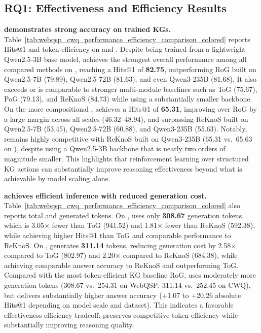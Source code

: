 \subsection{RQ1: Effectiveness and Efficiency Results}
\label{sec:exp1}



\noindent \textbf{\framework{} demonstrates strong accuracy on trained KGs.}
Table~\ref{tab:webqsp_cwq_performance_efficiency_comparison_colored} reports Hits@1 and token efficiency on  and . Despite being trained from a lightweight Qwen2.5-3B base model, \framework{} achieves the strongest overall performance among all compared methods on , reaching a Hits@1 of \textbf{82.75}, outperforming RoG built on Qwen2.5-7B (79.89), Qwen2.5-72B (81.63), and even Qwen3-235B (81.68). It also exceeds or is comparable to stronger multi-module baselines such as ToG (75.67), PoG (79.13), and ReKnoS (84.73) while using a substantially smaller backbone.
On the more compositional , \framework{} achieves a Hits@1 of \textbf{65.31}, improving over RoG by a large margin across all scales (46.32--48.94), and surpassing ReKnoS built on Qwen2.5-7B (53.45), Qwen2.5-72B (60.88), and Qwen3-235B (55.63). Notably, \framework{} remains highly competitive with ReKnoS built on Qwen3-235B (65.31 vs.\ 65.63 on ), despite using a Qwen2.5-3B backbone that is nearly two orders of magnitude smaller. This highlights that reinforcement learning over structured KG actions can substantially improve reasoning effectiveness beyond what is achievable by model scaling alone.

\noindent \textbf{\framework{} achieves efficient inference with reduced generation cost.}
Table~\ref{tab:webqsp_cwq_performance_efficiency_comparison_colored} also reports total and generated tokens. On , \framework{} uses only \textbf{308.67} generation tokens, which is 3.05$\times$ fewer than ToG (941.52) and 1.81$\times$ fewer than ReKnoS (592.38), while achieving higher Hits@1 than ToG and comparable performance to ReKnoS. On , \framework{} generates \textbf{311.14} tokens, reducing generation cost by 2.58$\times$ compared to ToG (802.97) and 2.20$\times$ compared to ReKnoS (684.38), while achieving comparable answer accuracy to ReKnoS and outperforming ToG. Compared with the most token-efficient KG baseline RoG, \framework{} uses moderately more generation tokens (308.67 vs.\ 254.31 on WebQSP; 311.14 vs.\ 252.45 on CWQ), but delivers substantially higher answer accuracy (+1.07 to +20.26 absolute Hits@1 depending on model scale and dataset). This indicates a favorable effectiveness-efficiency tradeoff: \framework{} preserves competitive token efficiency while substantially improving reasoning quality.

